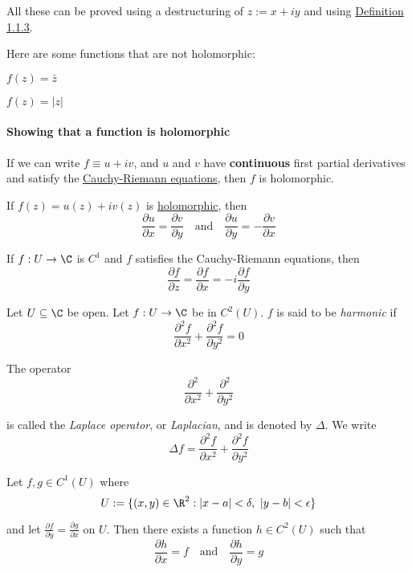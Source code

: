 All these can be proved using a destructuring of $z:=x+iy$ and using
\href{ffea0ed}{Definition 1.1.3}.

Here are some functions that are not holomorphic:
\begin{enumerati}
  \item $f(z)=\bar z$
  \item $f(z)=|z|$
\end{enumerati}

\paragraph{Showing that a function is holomorphic}

If we can write $f\equiv u+iv$, and $u$ and $v$ have \textbf{continuous} first
partial derivatives and satisfy the \href{fb10fd3}{Cauchy-Riemann equations},
then $f$ is holomorphic.

\label{fb10fd3}

If $f(z) = u(z) + iv(z)$ is \href{e1e08f7}{holomorphic}, then
$$
  \frac{\partial u}{\partial x}=\frac{\partial v}{\partial y}
  \quad\text{and}\quad
  \frac{\partial u}{\partial y}=-\frac{\partial v}{\partial x}
$$

\label{d507f47}

If $f:U\to\C$ is $C^1$ and $f$ satisfies the Cauchy-Riemann equations, then
$$
  \frac{\partial f}{\partial z}=\frac{\partial f}{\partial x}=
  -i\frac{\partial f}{\partial y}
$$

\label{d53f60f}

Let $U\subseteq\C$ be open. Let $f:U\to\C$ be in $C^2(U)$. $f$ is said to be
\textit{harmonic} if
$$
  \frac{\partial^2f}{\partial x^2}+\frac{\partial^2f}{\partial y^2}=0
$$

The operator
$$
  \frac{\partial^2}{\partial x^2}+\frac{\partial^2}{\partial y^2}
$$

is called the \textit{Laplace operator}, or \textit{Laplacian}, and is denoted
by $\Delta$. We write
$$
  \Delta f=\frac{\partial^2f}{\partial x^2}+\frac{\partial^2f}{\partial y^2}
$$

\label{fdd4521}

Let $f,g\in C^1(U)$ where
$$
  U:=\{ (x,y)\in\R^2:|x-a|<\delta,\ |y-b|<\epsilon \}
$$

and let $\displaystyle\frac{\partial f}{\partial y}=\frac{\partial g}{\partial
  x}$ on $U$. Then there exists a function $h\in C^2(U)$ such that
$$
  \frac{\partial h}{\partial x}=f
  \quad\text{and}\quad
  \frac{\partial h}{\partial y}=g
$$

